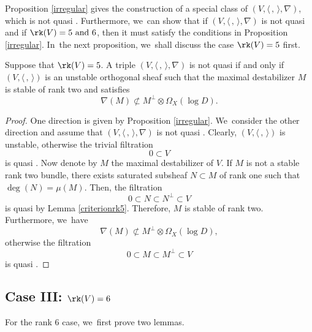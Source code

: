 Proposition \ref{irregular} gives the construction of a special class of $(V, \langle \,,\, \rangle, \nabla)$, which is not quasi \grsemistable. Furthermore, we~can show that if $(V, \langle \,,\, \rangle, \nabla)$ is not quasi \grsemistable and if $\rk(V)=5 \text{ and } 6$, then it must satisfy the conditions in Proposition \ref{irregular}. In~the next proposition, we~shall discuss the case $\rk(V)=5$ first.

\begin{prop}\label{classfication5}
Suppose that $\rk(V)=5$. A triple $(V,\langle \,, \, \rangle,\nabla)$ is not quasi \grsemistable if and only if $(V, \langle \,, \, \rangle)$ is an unstable orthogonal sheaf such that the maximal destabilizer $M$ is stable of rank two and satisfies
\[
\nabla(M)\not\subset M^\perp\otimes\Omega_X(\log D).
\]
\end{prop}

\begin{proof} 
One direction is given by Proposition \ref{irregular}. We~consider the other direction and assume that $(V,\langle \,, \, \rangle,\nabla)$ is not quasi \grsemistable. Clearly, $(V, \langle \,, \, \rangle)$ is unstable, otherwise the trivial filtration
\[
0\subset V
\]
is quasi \grsemistable. Now denote by $M$ the maximal destabilizer of $V$. If $M$ is not a stable rank two bundle, there exists saturated subsheaf $N \subset M$ of rank one such that $\deg(N)=\mu(M)$. Then, the filtration
\[
0\subset N\subset N^\perp\subset V
\]
is quasi \grsemistable by Lemma \ref{criterionrk5}. Therefore, $M$ is stable of rank two. Furthermore, we~have
\[
\nabla(M)\not\subset M^\perp\otimes\Omega_X(\log D),
\]
otherwise the filtration
\[
0\subset M \subset M^\perp\subset V
\]
is quasi \grsemistable.
\end{proof}

\subsection{Case III: ${\rk(V) = 6}$}
For the rank $6$ case, we~first prove two lemmas.

